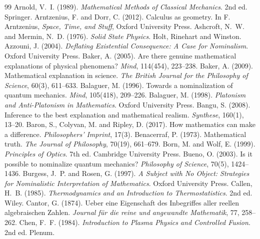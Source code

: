 \documentclass{situationist-preprint}
\begin{document}
\begin{thebibliography}{99}\small
{} Arnold, V.~I. (1989). \emph{Mathematical Methods of Classical Mechanics}. 2nd ed. Springer.
 Arntzenius, F. and Dorr, C. (2012). Calculus as geometry. In F. Arntzenius, \emph{Space, Time, and Stuff}, Oxford University Press.
 Ashcroft, N.~W. and Mermin, N.~D. (1976). \emph{Solid State Physics}. Holt, Rinehart and Winston.
 Azzouni, J. (2004). \emph{Deflating Existential Consequence: A Case for Nominalism}. Oxford University Press.
 Baker, A. (2005). Are there genuine mathematical explanations of physical phenomena? \emph{Mind}, 114(454), 223--238.
 Baker, A. (2009). Mathematical explanation in science. \emph{The British Journal for the Philosophy of Science}, 60(3), 611--633.
 Balaguer, M. (1996). Towards a nominalization of quantum mechanics. \emph{Mind}, 105(418), 209--226.
 Balaguer, M. (1998). \emph{Platonism and Anti-Platonism in Mathematics}. Oxford University Press.
 Bangu, S. (2008). Inference to the best explanation and mathematical realism. \emph{Synthese}, 160(1), 13--20.
 Baron, S., Colyvan, M. and Ripley, D. (2017). How mathematics can make a difference. \emph{Philosophers' Imprint}, 17(3).
 Benacerraf, P. (1973). Mathematical truth. \emph{The Journal of Philosophy}, 70(19), 661--679.
 Born, M. and Wolf, E. (1999). \emph{Principles of Optics}. 7th ed. Cambridge University Press.
 Bueno, O. (2003). Is it possible to nominalize quantum mechanics? \emph{Philosophy of Science}, 70(5), 1424--1436.
 Burgess, J.~P. and Rosen, G. (1997). \emph{A Subject with No Object: Strategies for Nominalistic Interpretation of Mathematics}. Oxford University Press.
 Callen, H.~B. (1985). \emph{Thermodynamics and an Introduction to Thermostatistics}. 2nd ed. Wiley.
 Cantor, G. (1874). Ueber eine Eigenschaft des Inbegriffes aller reellen algebraischen Zahlen. \emph{Journal f\"ur die reine und angewandte Mathematik}, 77, 258--262.
 Chen, F.~F. (1984). \emph{Introduction to Plasma Physics and Controlled Fusion}. 2nd ed. Plenum.

\end{thebibliography}
\end{document}
